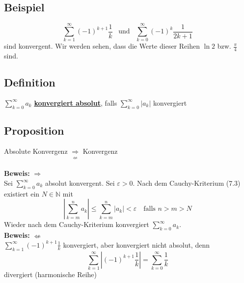 \subsection{Beispiel} %
\label{sub:beispiel}
\[
	\sum\limits_{k=1}^{\infty} (-1)^{k+1} \frac{1}{k} \enspace \text{ und } \enspace 
	\sum\limits_{k=0}^{\infty} (-1)^k \frac{1}{2k+1}
\]
sind konvergent. Wir werden sehen, dass die Werte dieser Reihen $\ln 2$ bzw. $\frac{\pi}{4}$ sind. 

\subsection{Definition} %
\label{sub:definition}
$\sum\limits_{k=0}^{\infty} a_k$ \underline{\textbf{konvergiert absolut}}, falls $\sum\limits_{k=0}^{\infty} |a_k|$ konvergiert

\subsection{Proposition} %
\label{sub:proposition}
Absolute Konvergenz $\underset{\nLeftarrow}{\Rightarrow} $ Konvergenz \\
\vspace{\baselineskip} \\
\textbf{Beweis:} $\Rightarrow $ \\
Sei $\sum\limits_{k=0}^{\infty} a_k$ absolut konvergent. Sei $\varepsilon >0$. Nach dem Cauchy-Kriterium (7.3) existiert ein 
$N \in \mathds{N}$ mit
\[
	\left|\sum\limits_{k=m}^{n} a_k \right| \leq \sum\limits_{k=m}^{n} |a_k| < \varepsilon \quad \text{falls } n>m>N
\]
Wieder nach dem Cauchy-Kriterium konvergiert $\sum\limits_{k=0}^{\infty} a_k$.
\vspace{\baselineskip} \\
\textbf{Beweis:} $\nLeftarrow$ \\
$\sum\limits_{k=1}^{\infty} (-1)^{k+1} \frac{1}{k}$ konvergiert, aber konvergiert nicht absolut, denn
\[
	\sum\limits_{k=1}^{\infty} \left|(-1)^{k+1} \frac{1}{k}\right| = \sum\limits_{k=0}^{\infty} \frac{1}{k}
\]
divergiert (harmonische Reihe)

